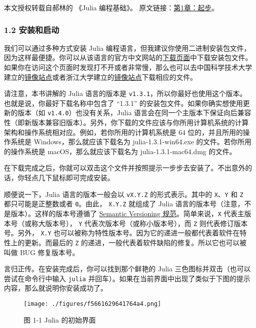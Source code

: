 
本文授权转载自郝林的 《Julia 编程基础》。 原文链接：\href{https://github.com/hyper0x/JuliaBasics/blob/master/book/ch01.md}{第1章：起步}。

\subsubsection{1.2 安装和启动}

我们可以通过多种方式安装 Julia 编程语言，但我建议你使用二进制安装包文件，因为这样最便捷。你可以从该语言的官方中文网站的\href{https://cn.julialang.org/downloads/}{下载页面}中下载安装包文件。如果你在访问这个页面时发现打不开或者非常慢，那么也可以去中国科学技术大学建立的\href{https://mirrors.zju.edu.cn/julia/releases/}{镜像站点}或者浙江大学建立的\href{https://mirrors.ustc.edu.cn/julia/releases/}{镜像站点}下载相应的文件。

请注意，本书讲解的 Julia 语言的版本是 \verb`v1.3.1`，所以你最好也使用这个版本。也就是说，你最好下载名称中包含了 “1.3.1” 的安装包文件。如果你确实想使用更新的版本（如 \verb`v1.4.0`）也没有关系，Julia 语言会在同一个主版本下保证向后兼容性（即新版本兼容旧版本）。另外，你下载的文件应该与你所用计算机系统的计算架构和操作系统相对应。例如，若你所用的计算机系统是 64 位的，并且所用的操作系统是 Windows，那么就应该下载名为 julia-1.3.1-win64.exe 的文件。若你所用的操作系统是 macOS，那么就应该下载名为 julia-1.3.1-mac64.dmg 的文件。

在下载完成之后，你就可以双击这个文件并按照提示一步步去安装了。不出意外的话，你轻点几下鼠标即可完成安装。

顺便说一下，Julia 语言的版本一般会以 \verb`vX.Y.Z` 的形式表示。其中的 \verb`X`、\verb`Y` 和 \verb`Z` 都只可能是正整数或者 \verb`0`。由此， \verb`X.Y.Z` 就组成了 Julia 语言的版本号（注意，不是版本）。这样的版本号遵循了 \href{https://semver.org}{Semantic Versioning 规范}。简单来说，\verb`X` 代表主版本号（或称大版本号）， \verb`Y` 代表次版本号（或称小版本号），而 \verb`Z` 则代表修订版本号。另外， \verb`X.Y` 也可以被称为特性版本号。因为它的递进一般都代表着软件在特性上的更新。而最后的 \verb`Z` 的递进，一般代表着软件缺陷的修复。所以它也可以被叫做 BUG 修复版本号。

言归正传。在安装完成后，你可以找到那个鲜艳的 Julia 三色图标并双击（也可以尝试在命令行中输入 \verb`julia` 并回车）。如果在当前界面中出现了类似于下图的提示内容，那么就说明你安装成功了。

\begin{figure}[ht]
\centering
\texttt{[image: ./figures/f5661629641764a4.png]}
\caption{图 1-1 Julia 的初始界面} \label{fig_JuC1S2_1}
\end{figure}


